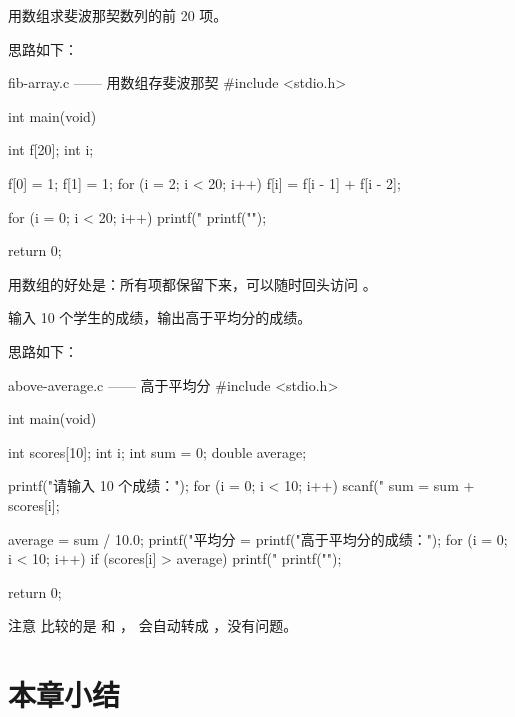 \begin{example}
用数组求斐波那契数列的前 20 项。
\end{example}
\begin{solution}
思路如下：

\begin{codebox}{fib-array.c —— 用数组存斐波那契}
#include <stdio.h>

int main(void)
{
    int f[20];
    int i;

    f[0] = 1;
    f[1] = 1;
    for (i = 2; i < 20; i++) {
        f[i] = f[i - 1] + f[i - 2];
    }

    for (i = 0; i < 20; i++) {
        printf("%
    }
    printf("\n");

    return 0;
}
\end{codebox}

用数组的好处是：所有项都保留下来，可以随时回头访问 。
\end{solution}

\begin{example}
输入 10 个学生的成绩，输出高于平均分的成绩。
\end{example}
\begin{solution}
思路如下：

\begin{codebox}{above-average.c —— 高于平均分}
#include <stdio.h>

int main(void)
{
    int scores[10];
    int i;
    int sum = 0;
    double average;

    printf("请输入 10 个成绩：");
    for (i = 0; i < 10; i++) {
        scanf("%
        sum = sum + scores[i];
    }

    average = sum / 10.0;
    printf("平均分 = %
    printf("高于平均分的成绩：");
    for (i = 0; i < 10; i++) {
        if (scores[i] > average) {
            printf("%
        }
    }
    printf("\n");

    return 0;
}
\end{codebox}

注意  比较的是  和 ， 会自动转成 ，没有问题。
\end{solution}

\section{本章小结}

